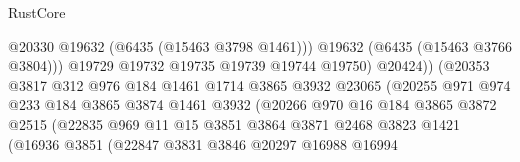 \begin{lexlean}{RustCore}
\begin{coremodule}
                                            @20330
                                            @19632
                                            (@6435 (@15463 @3798 @1461)))
                                          @19632
                                          (@6435 (@15463 @3766 @3804)))
                                        @19729
                                        @19732
                                        @19735
                                        @19739
                                        @19744
                                        @19750)
                                      @20424))
                                  (@20353
                                    @3817
                                    @312
                                    @976
                                    @184
                                    @1461
                                    @1714
                                    @3865
                                    @3932
                                    @23065
                                    (@20255
                                      @971
                                      @974
                                      @233
                                      @184
                                      @3865
                                      @3874
                                      @1461
                                      @3932
                                      (@20266
                                        @970
                                        @16
                                        @184
                                        @3865
                                        @3872
                                        @2515
                                        (@22835
                                          @969
                                          @11
                                          @15
                                          @3851
                                          @3864
                                          @3871
                                          @2468
                                          @3823
                                          @1421
                                          (@16936
                                            @3851
                                            (@22847
                                              @3831
                                              @3846
                                              @20297
                                              @16988
                                              @16994

\end{coremodule}
\end{lexlean}

